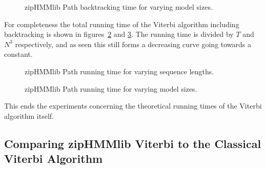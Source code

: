 \begin{figure}
  \centering
  
  \caption{zipHMMlib Path backtracking time for varying model sizes.}
  \label{fig:assymptotic_viterbi_backtrack_k}
\end{figure}

For completeness the total running time of the Viterbi algorithm including
backtracking is shown in figures~\ref{fig:assymptotic_viterbi_path_n} and
\ref{fig:assymptotic_viterbi_path_k}. The running time is divided by $T$ and
$N^3$ respectively, and as seen this still forms a decreasing curve going
towards a constant.

\begin{figure}
  \centering
  
  \caption{zipHMMlib Path running time for varying sequence lengths.}
  \label{fig:assymptotic_viterbi_path_n}
\end{figure}

\begin{figure}
  \centering
  
  \caption{zipHMMlib Path running time for varying model sizes.}
  \label{fig:assymptotic_viterbi_path_k}
\end{figure}

This ends the experiments concerning the theoretical running times of the
Viterbi algorithm itself.

\subsection{Comparing zipHMMlib Viterbi to the Classical Viterbi Algorithm}

